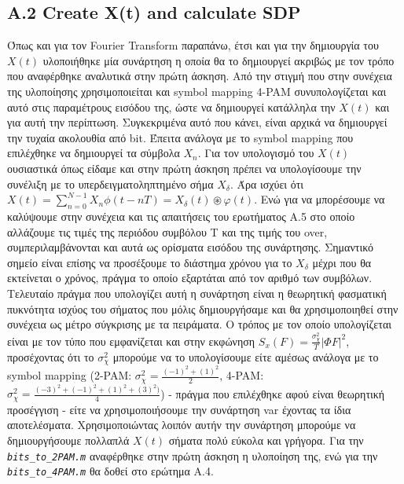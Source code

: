\documentclass[11pt]{article}
\begin{document}
    \subsection*{A.2 Create X(t) and calculate SDP}
    Όπως και για τον Fourier Transform παραπάνω, έτσι και για την δημιουργία του $X(t)$ υλοποιήθηκε μία συνάρτηση η οποία θα το δημιουργεί ακριβώς με τον τρόπο που αναφέρθηκε αναλυτικά στην πρώτη άσκηση. Από την στιγμή που στην συνέχεια της υλοποίησης χρησιμοποιείται και symbol mapping 4-PAM συνυπολογίζεται και αυτό στις παραμέτρους εισόδου της, ώστε να δημιουργεί κατάλληλα την $X(t)$ και για αυτή την περίπτωση. 
    Συγκεκριμένα αυτό που κάνει, είναι αρχικά να δημιουργεί την τυχαία ακολουθία από bit. 
    Έπειτα ανάλογα με το symbol mapping που επιλέχθηκε να δημιουργεί τα σύμβολα $X_n$. Για τον υπολογισμό του $X(t)$ ουσιαστικά όπως είδαμε και στην πρώτη άσκηση πρέπει να υπολογίσουμε την συνέλιξη με το υπερδειγματοληπτημένο σήμα $X_{\delta}$.
    Άρα ισχύει ότι $X(t) = \sum_{n=0}^{N-1}X_n\phi(t-nT) = X_δ (t) \circledast  φ(t)$. 
    Ενώ για να μπορέσουμε να καλύψουμε στην συνέχεια και τις απαιτήσεις του ερωτήματος Α.5 στο οποίο αλλάζουμε τις τιμές της περιόδου συμβόλου T και της τιμής του over, συμπεριλαμβάνονται και αυτά ως ορίσματα εισόδου της συνάρτησης.
    Σημαντικό σημείο είναι επίσης να προσέξουμε το διάστημα χρόνου για το $X_{\delta}$ μέχρι που θα εκτείνεται ο χρόνος, πράγμα το οποίο εξαρτάται από τον αριθμό των συμβόλων. 
    Τελευταίο πράγμα που υπολογίζει αυτή η συνάρτηση είναι η θεωρητική φασματική πυκνότητα ισχύος του σήματος που μόλις δημιουργήσαμε και θα χρησιμοποιηθεί στην συνέχεια ως μέτρο σύγκρισης με τα πειράματα. 
    Ο τρόπος με τον οποίο υπολογίζεται είναι με τον τύπο που εμφανίζεται και στην εκφώνηση $S_x(F)=\frac{σ_χ^2}{T}|\Phi{F}|^2$, προσέχοντας ότι το $σ_χ^2$ μπορούμε να το υπολογίσουμε είτε αμέσως ανάλογα με το symbol mapping (2-PAM: $σ_χ^2=\frac{(-1)^2+(1)^2}{2}$, 4-PAM: $σ_χ^2=\frac{(-3)^2+(-1)^2+(1)^2+(3)^2)}{4}$) - πράγμα που επιλέχθηκε αφού είναι θεωρητική προσέγγιση - είτε να χρησιμοποιήσουμε την συνάρτηση var έχοντας τα ίδια αποτελέσματα.
    Χρησιμοποιώντας λοιπόν αυτήν την συνάρτηση μπορούμε να δημιουργήσουμε πολλαπλά $X(t)$ σήματα πολύ εύκολα και γρήγορα.
    Για την \emph{\texttt{bits\_to\_2PAM.m}} αναφέρθηκε στην πρώτη άσκηση η υλοποίηση της, ενώ για την \emph{\texttt{bits\_to\_4PAM.m}} θα δοθεί στο ερώτημα Α.4.
    
\end{document}
